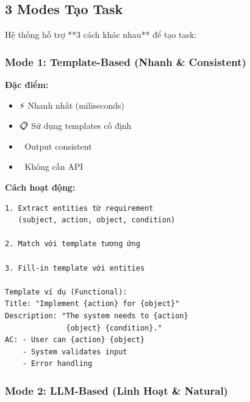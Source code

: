 \documentclass[12pt, a4paper]{report}
\begin{document}
\subsection{3 Modes Tạo Task}

Hệ thống hỗ trợ **3 cách khác nhau** để tạo task:

\subsubsection{Mode 1: Template-Based (Nhanh \& Consistent)}

\begin{tcolorbox}[colback=red!5, colframe=red!50]
\textbf{Đặc điểm:}
\begin{itemize}
    \item ⚡ Nhanh nhất (miliseconds)
    \item 📋 Sử dụng templates cố định
    \item 🎯 Output consistent
    \item 💾 Không cần API
\end{itemize}

\textbf{Cách hoạt động:}
\begin{lstlisting}
1. Extract entities từ requirement 
   (subject, action, object, condition)
   
2. Match với template tương ứng
   
3. Fill-in template với entities

Template ví dụ (Functional):
Title: "Implement {action} for {object}"
Description: "The system needs to {action} 
              {object} {condition}."
AC: - User can {action} {object}
    - System validates input
    - Error handling
\end{lstlisting}
\end{tcolorbox}

\subsubsection{Mode 2: LLM-Based (Linh Hoạt \& Natural)}
\end{document}
